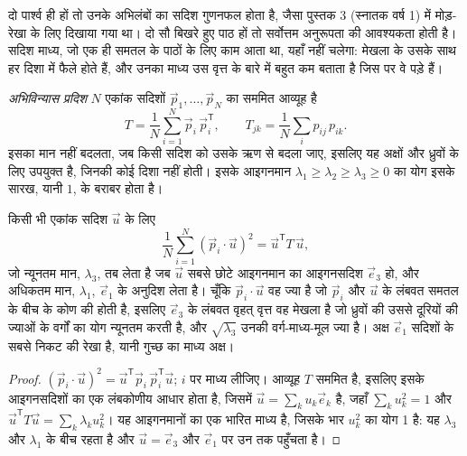 दो पार्श्व ही हों तो  उनके अभिलंबों का सदिश गुणनफल होता है,
जैसा पुस्तक 3 (स्नातक वर्ष 1) में मोड़-रेखा के लिए दिखाया गया था। दो सौ बिखरे हुए पाठ हों तो
सर्वोत्तम अनुरूपता की आवश्यकता होती है। सदिश माध्य, जो एक ही समतल के पाठों के लिए
काम आता था, यहाँ नहीं चलेगा: मेखला के  उसके साथ हर दिशा में फैले होते हैं,
और उनका माध्य उस वृत्त के बारे में बहुत कम बताता है जिस पर वे पड़े हैं।

\begin{definition}[अभिविन्यास प्रदिश]\label{def:b3:structural-analysis:orientation-tensor}
\emph{अभिविन्यास प्रदिश} $N$ एकांक सदिशों
$\vec p_1, \dots, \vec p_N$ का सममित आव्यूह है
\[
  T = \frac1N\sum_{i=1}^N \vec p_i\,\vec p_i^{\mathsf T},
  \qquad T_{jk} = \frac1N\sum_i p_{ij}\,p_{ik} .
\]
इसका मान नहीं बदलता, जब किसी सदिश को उसके ऋण से बदला जाए, इसलिए यह
अक्षों और ध्रुवों के लिए उपयुक्त है, जिनकी कोई दिशा नहीं होती। इसके आइगनमान $\lambda_1 \ge \lambda_2
\ge \lambda_3 \ge 0$ का योग इसके सारख, यानी $1$, के बराबर होता है।
\end{definition}

\begin{theorem}[अभिविन्यास प्रदिश से गुच्छ और मेखला]\label{thm:b3:structural-analysis:tensor}
किसी भी एकांक सदिश $\vec u$ के लिए
\[
  \frac1N\sum_{i=1}^N (\vec p_i\cdot\vec u)^2 = \vec u^{\mathsf T}T\,\vec u ,
\]
जो न्यूनतम मान, $\lambda_3$, तब लेता है जब $\vec u$ सबसे छोटे आइगनमान का
आइगनसदिश $\vec e_3$ हो, और अधिकतम मान, $\lambda_1$, $\vec e_1$ के अनुदिश लेता है।
चूँकि $\vec p_i\cdot\vec u$ वह ज्या है जो $\vec p_i$ और $\vec u$ के
लंबवत समतल के बीच के कोण की होती है, इसलिए $\vec e_3$ के लंबवत वृहत् वृत्त वह मेखला है
जो ध्रुवों की उससे दूरियों की ज्याओं के वर्गों का योग न्यूनतम करती है, और $\sqrt{\lambda_3}$
उनकी वर्ग-माध्य-मूल ज्या है। अक्ष $\vec e_1$ सदिशों के सबसे निकट की
रेखा है,
यानी गुच्छ का माध्य अक्ष।
\end{theorem}

\begin{proof}
$(\vec p_i\cdot\vec u)^2 = \vec u^{\mathsf T}\vec p_i\,\vec p_i^{\mathsf T}\vec
u$; $i$ पर माध्य लीजिए। आव्यूह $T$ सममित है, इसलिए इसके आइगनसदिशों का एक
लंबकोणीय आधार होता है, जिसमें $\vec u = \sum_k u_k\vec e_k$ है, जहाँ $\sum_k
u_k^2 = 1$ और $\vec u^{\mathsf T}T\vec u = \sum_k\lambda_k u_k^2$। यह आइगनमानों का एक
भारित माध्य है, जिसके भार $u_k^2$ का योग 1 है: यह $\lambda_3$ और $\lambda_1$ के बीच रहता है
और $\vec u = \vec
e_3$ और $\vec e_1$ पर उन तक पहुँचता है।
\end{proof}

